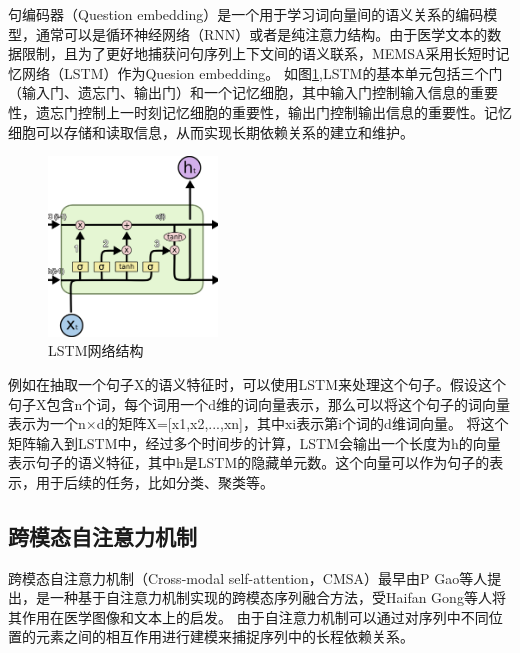 \begin{enumerate}[topsep = 0 pt, itemsep= 0 pt, parsep=0pt, partopsep=0pt, leftmargin=0pt, itemindent=44pt, labelsep=6pt, listparindent=22pt, label=(\arabic*)]
	句编码器（Question embedding）是一个用于学习词向量间的语义关系的编码模型，通常可以是循环神经网络（RNN）或者是纯注意力结构。由于医学文本的数据限制，且为了更好地捕获问句序列上下文间的语义联系，MEMSA采用长短时记忆网络\cite{hochreiter1997long}（LSTM）作为Quesion embedding。
	如图\ref{fig:lstm},LSTM的基本单元包括三个门（输入门、遗忘门、输出门）和一个记忆细胞，其中输入门控制输入信息的重要性，遗忘门控制上一时刻记忆细胞的重要性，输出门控制输出信息的重要性。记忆细胞可以存储和读取信息，从而实现长期依赖关系的建立和维护。
	\begin{figure}[htbp]
		\centering	
		\includegraphics[width=0.4\textwidth]{Fig/myfig/chapter3/lstm.png}  %
		\caption{\label{fig:lstm}LSTM网络结构} 
	\end{figure}
	例如在抽取一个句子X的语义特征时，可以使用LSTM来处理这个句子。假设这个句子X包含n个词，每个词用一个d维的词向量表示，那么可以将这个句子的词向量表示为一个n×d的矩阵X=[x1,x2,...,xn]，其中xi表示第i个词的d维词向量。
	将这个矩阵输入到LSTM中，经过多个时间步的计算，LSTM会输出一个长度为h的向量表示句子的语义特征，其中h是LSTM的隐藏单元数。这个向量可以作为句子的表示，用于后续的任务，比如分类、聚类等。
\end{enumerate}

\subsection{跨模态自注意力机制}
跨模态自注意力机制（Cross-modal self-attention，CMSA）最早由P Gao等人\cite{gao2019dynamic}提出，是一种基于自注意力机制实现的跨模态序列融合方法，受Haifan Gong等人\cite{gong2021cross}将其作用在医学图像和文本上的启发。
由于自注意力机制可以通过对序列中不同位置的元素之间的相互作用进行建模来捕捉序列中的长程依赖关系。

